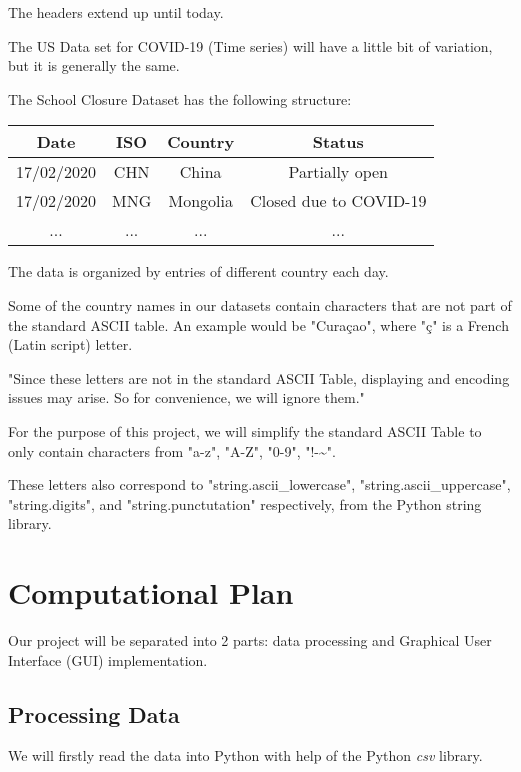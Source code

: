 \documentclass[fontsize=11pt]{article}
\begin{document}
The headers extend up until today.

The US Data set for COVID-19 (Time series) will have a little bit of variation, but it is generally the same.

The School Closure Dataset has the following structure:
\begin{center}
    \begin{tabular}{ |c|c|c|c| }
        \hline
        Date & ISO & Country & Status \\
        \hline
        17/02/2020 & CHN & China & Partially open \\
        \hline
        17/02/2020 & MNG & Mongolia & Closed due to COVID-19 \\
        \hline
        ... & ... & ... & ...\\
        \hline
    \end{tabular}
\end{center}

The data is organized by entries of different country each day.

Some of the country names in our datasets contain characters that are not part of the standard ASCII table. An example would be "Cura\c{c}ao", where "\c{c}" is a French (Latin script) letter.

"Since these letters are not in the standard ASCII Table, displaying and encoding issues may arise. So for convenience, we will ignore them."

For the purpose of this project, we will simplify the standard ASCII Table to only contain characters from "a-z", "A-Z", "0-9", "!-\~{}".

These letters also correspond to "string.ascii\_lowercase", "string.ascii\_uppercase", "string.digits", and "string.punctutation" respectively, from the Python string library.

\newpage


\section*{Computational Plan}

Our project will be separated into 2 parts: data processing and Graphical User Interface (GUI) implementation.

\subsection*{Processing Data}

We will firstly read the data into Python with help of the Python \emph{csv} library.
\end{document}
